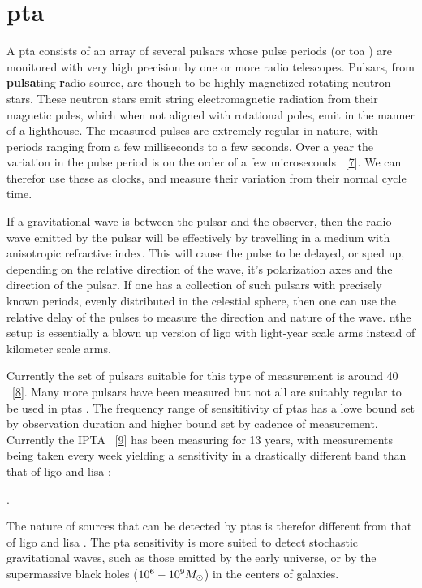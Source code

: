 \documentclass[
  10pt,
  a4paper,
  DIV=11,
  numbers=noendperiod,
  oneside]{scrreprt}
\let\[\relax \let\]\relax %
\DeclareRobustCommand{\[}{\begin{equation}}
\DeclareRobustCommand{\]}{\end{equation}}
\begin{document}
\hypertarget{pta}{%
\section{\texorpdfstring{\gls{pta}}{}}\label{pta}}

A \gls{pta} consists of an array of several pulsars whose pulse periods
(or \gls{toa} ) are monitored with very high precision by one or more
radio telescopes. Pulsars, from \textbf{pulsa}ting \textbf{r}adio
source, are though to be highly magnetized rotating neutron stars. These
neutron stars emit string electromagnetic radiation from their magnetic
poles, which when not aligned with rotational poles, emit in the manner
of a lighthouse. The measured pulses are extremely regular in nature,
with periods ranging from a few milliseconds to a few seconds. Over a
year the variation in the pulse period is on the order of a few
microseconds ~{[}\protect\hyperlink{ref-Detweiler:1979wn}{7}{]}. We can
therefor use these as clocks, and measure their variation from their
normal cycle time.

If a gravitational wave is between the pulsar and the observer, then the
radio wave emitted by the pulsar will be effectively by travelling in a
medium with anisotropic refractive index. This will cause the pulse to
be delayed, or sped up, depending on the relative direction of the wave,
it's polarization axes and the direction of the pulsar. If one has a
collection of such pulsars with precisely known periods, evenly
distributed in the celestial sphere, then one can use the relative delay
of the pulses to measure the direction and nature of the wave. nthe
setup is essentially a blown up version of \gls{ligo} with light-year
scale arms instead of kilometer scale arms.

Currently the set of pulsars suitable for this type of measurement is
around 40 ~{[}\protect\hyperlink{ref-Maiorano:2021}{8}{]}. Many more
pulsars have been measured but not all are suitably regular to be used
in \glspl{pta} . The frequency range of sensititivity of \glspl{pta} has
a lowe bound set by observation duration and higher bound set by cadence
of measurement. Currently the IPTA
~{[}\protect\hyperlink{ref-Hobbs:2009yy}{9}{]} has been measuring for 13
years, with measurements being taken every week yielding a sensitivity
in a drastically different band than that of \gls{ligo} and \gls{lisa} :

\[
.
\]

The nature of sources that can be detected by \glspl{pta} is therefor
different from that of \gls{ligo} and \gls{lisa} . The \gls{pta}
sensitivity is more suited to detect stochastic gravitational waves,
such as those emitted by the early universe, or by the supermassive
black holes (\(10^6-10^9M_\odot\)) in the centers of
galaxies.
\end{document}
